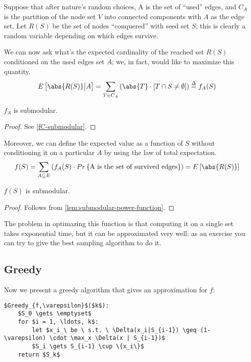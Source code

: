Suppose that after nature's random choices, A is the set of ``used'' edges, and $C_A$ is the partition of the node set $V$ into connected components with $A$ as the edge set.
Let $R(S)$ be the set of nodes ``conquered'' with seed set $S$; this is clearly a random variable depending on which edges survive.

We can now ask what's the expected cardinality of the reached set $R(S)$ conditioned on the used edges set $A$; we, in fact, would like to maximize this quantity.
%
\begin{align}
    E\left[\abs{R(S)} \big\rvert A\right] = \sum_{T \in C_A}{\left( \abs{T} \cdot \left[ T \cap S \neq \emptyset \right] \right)} \overset{\Delta}{=} f_A(S)
\end{align}

\begin{claim}
    $f_A$ is submodular. 
\end{claim}

\begin{proof}
    See \cref{fC-submodular}.
\end{proof}

Moreover, we can define the expected value as a function of $S$ without conditioning it on a particular $A$ by using the law of total expectation.
\begin{align}
    f(S) = \sum_{A \subseteq E}\left( f_A(S) \cdot Pr\left\{ \text{A is the set of survived edges} \right\} \right) = E\left[ \abs{R(S)} \right]
\end{align}

\begin{claim}
    $f(S)$ is submodular.
\end{claim}

\begin{proof}
    Follows from \cref{lem:submodular-power-function}.
\end{proof}

The problem in optimazing this function is that computing it on a single set takes exponential time, but it can be approximated very well; as an exercise you can try to give the best sampling algorithm to do it.

\subsection{Greedy}

Now we present a greedy algorithm that gives an approximation for $f$:

\begin{lstlisting}[caption={Greedy algorithm},label={lst:fS-greedy}]
$Greedy_{f,\varepsilon}$($k$):
    $S_0 \gets \emptyset$
    for $i = 1, \ldots, k$:
        let $x_i \ be \ s.t. \ \Delta(x_i|S_{i-1}) \geq (1- \varepsilon) \cdot \max_x \Delta(x | S_{i-1})$
        $S_i \gets S_{i-1} \cup \{x_i\}$
    return $S_k$
\end{lstlisting}

